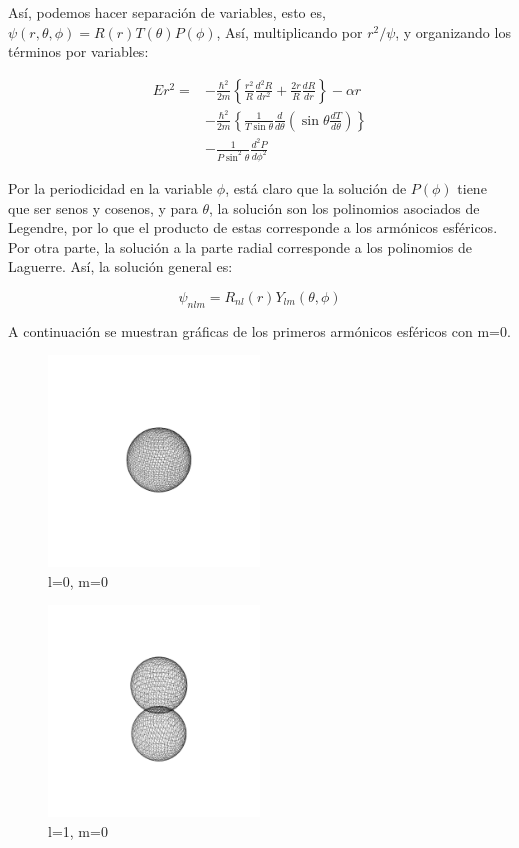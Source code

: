 \documentclass[twocolumn]{article}
\begin{document}
Así, podemos hacer separación de variables, esto es, $\psi(r, \theta, \phi) = R(r) T(\theta) P(\phi)$, Así, multiplicando por $r^2/\psi$, y organizando los términos por variables:

\begin{align*}
    Er^2 = &-\frac{\hbar^2}{2m} \left\{ \frac{r^2}{R} \frac{d^2R}{dr^2} + \frac{2r}{R} \frac{dR}{dr} \right\} - \alpha r \\
    &- \frac{\hbar^2}{2m} \left\{ \frac{1}{T\sin \theta} \frac{d}{d \theta } \left(\sin \theta \frac{d T}{d \theta}\right) \right\} \\
    &- \frac{1}{P\sin^2 \theta} \frac{d^2 P}{d \phi^2}
\end{align*}

Por la periodicidad en la variable $\phi$, está claro que la solución de $P(\phi)$ tiene que ser senos y cosenos, y para $\theta$, la solución son los polinomios asociados de Legendre, por lo que el producto de estas corresponde a los armónicos esféricos. Por otra parte, la solución a la parte radial corresponde a los polinomios de Laguerre. Así, la solución general es:

\begin{equation}
    \label{eq:Solucion}
    \psi_{nlm} = R_{nl}(r) Y_{lm}(\theta, \phi)
\end{equation}

A continuación se muestran gráficas de los primeros armónicos esféricos con m=0.

\begin{figure}[h!]
    \caption{l=0, m=0}
    \includegraphics[width=0.5\textwidth]{Y0-0.png}    
\end{figure}

\begin{figure}[h!]
    \caption{l=1, m=0}
    \includegraphics[width=0.5\textwidth]{Y1-0.png}    
\end{figure}
\end{document}
